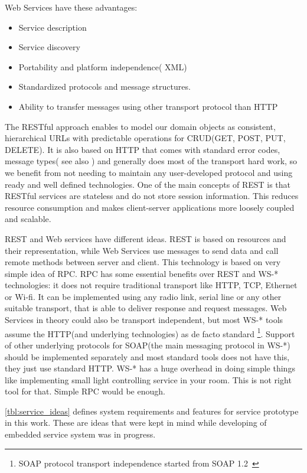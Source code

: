 Web Services have these advantages:
\begin{itemize}
  \item Service description
  \item Service discovery
  \item Portability and platform independence( XML)
  \item Standardized protocols and message structures.
  \item Ability to transfer messages using other transport protocol than HTTP
\end{itemize}

The RESTful approach enables to model our domain objects as
consistent, hierarchical URLs with predictable operations for \gls{CRUD}(GET,
POST, PUT, DELETE). It is also based on HTTP that comes with standard error
codes, message types( see also ) and
generally does most of the transport hard work, so we benefit from not
needing to maintain any user-developed protocol and using ready and well defined
technologies. One of the main concepts of REST is that RESTful services are
stateless and do not store session information. This reduces
resource consumption and makes client-server applications more loosely coupled
and scalable.

REST and Web services have different ideas. REST is based on resources and their
representation, while Web Services use messages to send data and call remote
methods between server and client. This technology is based on very simple idea
of \gls{RPC}. RPC has some essential benefits over REST and
WS-* technologies: it does not require traditional transport like HTTP, TCP,
Ethernet or Wi-fi. It can be implemented using any radio link, serial line or
any other suitable transport, that is able to deliver response and request
messages. Web Services in theory could also be transport independent, but most
WS-* tools assume the HTTP(and underlying technologies) as de facto standard
\footnote{SOAP protocol transport independence started from SOAP
1.2~\cite{soap_protocol_spec}}. Support of other underlying protocols for
SOAP(the main messaging protocol in WS-*) should be implemented separately and
most standard tools does not have this, they just use standard HTTP. WS-* has a
huge overhead in doing simple things like implementing small light
controlling service in your room. This is not right tool for that. Simple RPC
would be enough.

\autoref{tbl:service_ideas} defines system requirements and features for service prototype in this
work. These are ideas that were kept in mind while developing of embedded
service system was in progress.

